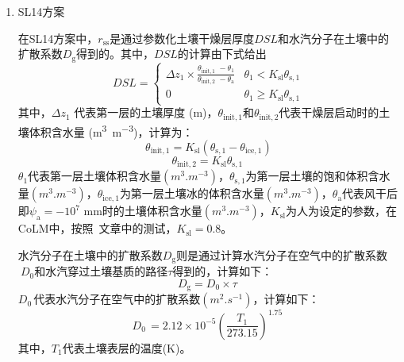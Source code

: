 \begin{enumerate}
    \def\labelenumi{\arabic{enumi}.}
  \item
    SL14方案

    在SL14方案中，\(r_{\mathrm{ss}}\)是通过参数化土壤干燥层厚度\(DSL\)和水汽分子在土壤中的扩散系数\(D_{\mathrm{g}}\)得到的。其中，\(DSL\)的计算由下式给出
    \begin{equation}
      DSL = \begin{cases}
        \Delta z_{1} \times \frac{\theta_{\mathrm{init,1\ \ }} - \theta_{1}}{\theta_{\mathrm{init,2\ \ }} - \theta_{\mathrm{a}}} & \theta_{1} < K_{\mathrm{sl}}\theta_{\mathrm{s,1}} \\
        0   & \theta_{1} \geqslant K_{\mathrm{sl}}\theta_{\mathrm{s,1}}
      \end{cases}
    \end{equation}
    其中，$\Delta z_{1}$ 代表第一层的土壤厚度 (\unit{m})，\(\theta_{\mathrm{init,1}}\)和\(\theta_{\mathrm{init,2}}\)代表干燥层启动时的土壤体积含水量 (\unit{m^{3}.m^{-3}})，计算为：
    \begin{equation}
      \theta_{\mathrm{init,1}} = K_{\mathrm{sl}}\left(\theta_{\mathrm{s,1}} - \theta_{\mathrm{ice,1}} \right)
    \end{equation}
    \begin{equation}
      \theta_{\mathrm{init,2}} = K_{\mathrm{sl}}\theta_{\mathrm{s,1}}\
    \end{equation}
    \(\theta_{1}\)代表第一层土壤体积含水量\((\unit{m^{3}.m^{-3}})\)，\(\theta_{\mathrm{s,1}}\)为第一层土壤的饱和体积含水量\((\unit{m^{3}.m^{-3}})\)，\(\theta_{\mathrm{ice,1}}\)为第一层土壤冰的体积含水量\((\unit{m^{3}.m^{-3}})\)，\(\theta_{\mathrm{a}}\)代表风干后即\(\psi_{\mathrm{a}} = - 10^{7}\) mm时的土壤体积含水量\((\unit{m^{3}.m^{-3}})\)，\(K_{\mathrm{sl}}\)为人为设定的参数，在CoLM中，按照~\citet{sl2014}文章中的测试，$K_{\mathrm{sl}}=0.8$。

    水汽分子在土壤中的扩散系数\(D_{\mathrm{g}}\)则是通过计算水汽分子在空气中的扩散系数\(\ D_{0}\)和水汽穿过土壤基质的路径\(\tau\)得到的，计算如下：
    \begin{equation}
      D_{\mathrm{g}} = D_{0} \times \tau\
    \end{equation}
    \(D_{0\ }\)代表水汽分子在空气中的扩散系数\((\unit{m^{2}.s^{- 1}})\)，计算如下：
    \begin{equation}
      D_{0\ } = 2.12 \times 10^{- 5}\left( \frac{T_{1}}{273.15} \right)^{1.75}\
    \end{equation}
    其中，\(T_{1}\)代表土壤表层的温度(K)。


\end{enumerate}

